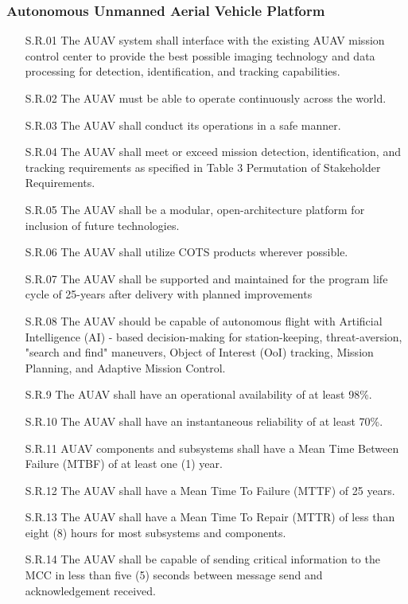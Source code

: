\begin{fullwidth}
    \subsubsection*{Autonomous Unmanned Aerial Vehicle Platform}
    \begin{enumerate}
        \item[S.R.01]{The AUAV system shall interface with the existing AUAV mission control center to provide the best possible imaging technology and data processing for detection, identification, and tracking capabilities.}
        \item[S.R.02]{The AUAV must be able to operate continuously across the world.}
        \item[S.R.03]{The AUAV shall conduct its operations in a safe manner.}
        \item[S.R.04]{The AUAV shall meet or exceed mission detection, identification, and tracking requirements as specified in Table 3 Permutation of Stakeholder Requirements.}
        \item[S.R.05]{The AUAV shall be a modular, open-architecture platform for inclusion of future technologies.}
        \item[S.R.06]{The AUAV shall utilize COTS products wherever possible.}
        \item[S.R.07]{The AUAV shall be supported and maintained for the program life cycle of 25-years after delivery with planned improvements}
        \item[S.R.08]{The AUAV should be capable of autonomous flight with Artificial Intelligence (AI) - based decision-making for station-keeping, threat-aversion, "search and find" maneuvers, Object of Interest (OoI) tracking, Mission Planning, and Adaptive Mission Control.}
        \item[S.R.9]{The AUAV shall have an operational availability of at least 98\%.}
        \item[S.R.10]{The AUAV shall have an instantaneous reliability of at least 70\%.}
        \item[S.R.11]{AUAV components and subsystems shall have a Mean Time Between Failure (MTBF) of at least one (1) year.}
        \item[S.R.12]{The AUAV shall have a Mean Time To Failure (MTTF) of 25 years.}
        \item[S.R.13]{The AUAV shall have a Mean Time To Repair (MTTR) of less than eight (8) hours for most subsystems and components.}
        \item[S.R.14]{The AUAV shall be capable of sending critical information to the MCC in less than five (5) seconds between message send and acknowledgement received.}
    \end{enumerate}

\end{fullwidth}
